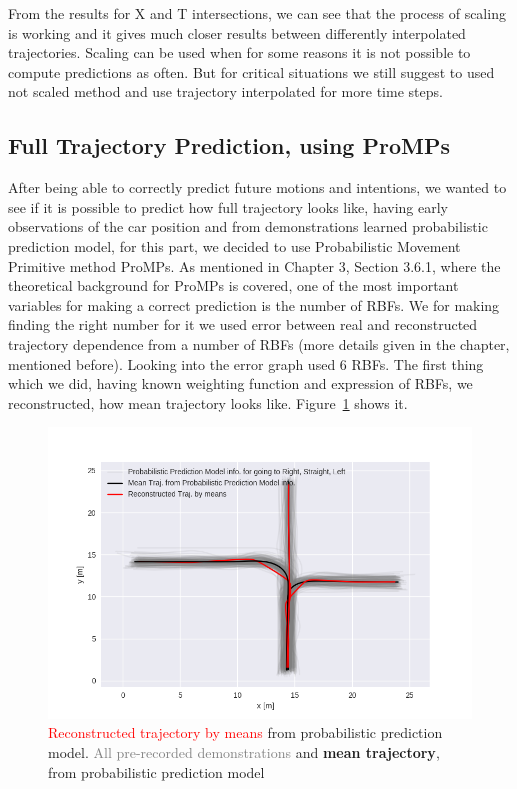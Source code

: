 From the results for X and T intersections, we can see that the process of scaling is working and it gives much closer results between differently interpolated trajectories. Scaling can be used when for some reasons it is not possible to compute predictions as often. But for critical situations we still suggest to used not scaled method and use trajectory interpolated for more time steps.

\subsection{Full Trajectory Prediction, using \gls{ProMPs}}

After being able to correctly predict future motions and intentions, we wanted to see if it is possible to predict how full trajectory looks like, having early observations of the car position and from demonstrations learned probabilistic prediction model, for this part, we decided to use Probabilistic Movement Primitive method \gls{ProMPs}. As mentioned in Chapter 3, Section 3.6.1, where the theoretical background for \gls{ProMPs} is covered, one of the most important variables for making a correct prediction is the number of \glspl{RBF}. We for making finding the right number for it we used error between real and reconstructed trajectory dependence from a number of \glspl{RBF} (more details given in the chapter, mentioned before). Looking into the error graph used $6$ \glspl{RBF}. The first thing which we did, having known weighting function and expression of \glspl{RBF}, we reconstructed, how mean trajectory looks like. Figure~\ref{fig:ReconstructedTraj} shows it.

\begin{figure}[H]
	\centering  	
	\includegraphics[width=12cm]{img/reconstructedTraj.png}
	\caption{\textcolor{red}{Reconstructed trajectory by means} from probabilistic prediction model. \textcolor{gray}{All pre-recorded demonstrations} and \textbf{mean trajectory}, from probabilistic prediction model}
	\label{fig:ReconstructedTraj}    
\end{figure}

